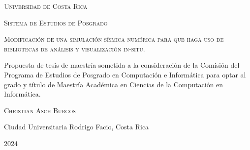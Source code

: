 \begin{titlepage}
  \begin{center}
    \large\textsc{Universidad de Costa Rica}

    \textsc{Sistema de Estudios de Posgrado}

    \vspace{4.5cm}
    \Large{\textsc{Modificación de una simulación sísmica numérica para que haga uso de bibliotecas de análisis y visualización in-situ.}}

    \vspace{3.5cm}
   \large Propuesta de tesis de maestría sometida a la consideración de la Comisión del Programa de Estudios de Posgrado en Computación e Informática para optar al grado y título de Maestría Académica en Ciencias de la Computación en Informática.

    \vspace{1.5cm}
    \textsc{Christian Asch Burgos}

    \vspace{1.5cm}
    Ciudad Universitaria Rodrigo Facio, Costa Rica

    2024
  \normalsize
  \end{center}
\end{titlepage}
